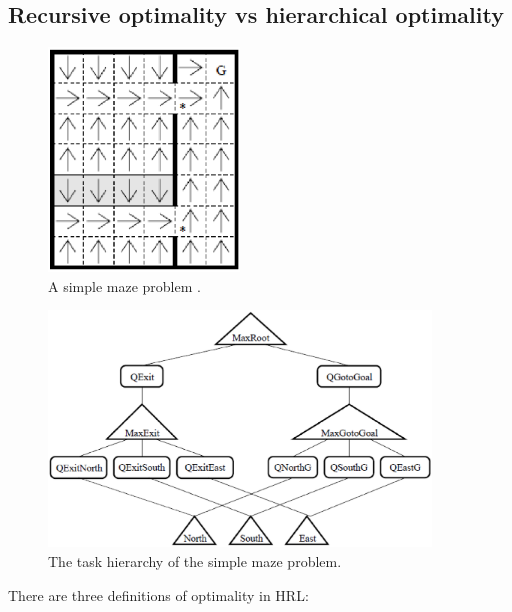 \subsection{Recursive optimality vs hierarchical optimality}
\label{se:ROHO}
\begin{figure}[t]
\begin{center}
    \includegraphics[width=2in] {./figures/Maze.eps}
\end{center}
\caption{A simple maze problem \cite{MaxQJ}.}
\label{fig:Maze}
\end{figure}
\begin{figure}[t]
\begin{center}
    \includegraphics[width=4in] {./figures/MazeH.eps}
\end{center}
\caption{The task hierarchy of the simple maze problem.}
\label{fig:MazeH}
\end{figure}

There are three definitions of optimality in HRL:

